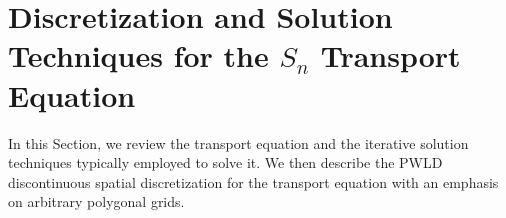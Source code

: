 \section{Discretization and Solution Techniques for the $S_n$ Transport Equation}\label{sec_transport}

In this Section, we review the \sn transport equation 
and the iterative solution techniques typically
employed to solve it. 
We then describe the PWLD discontinuous spatial
discretization for the transport equation with an emphasis on arbitrary
polygonal grids.

